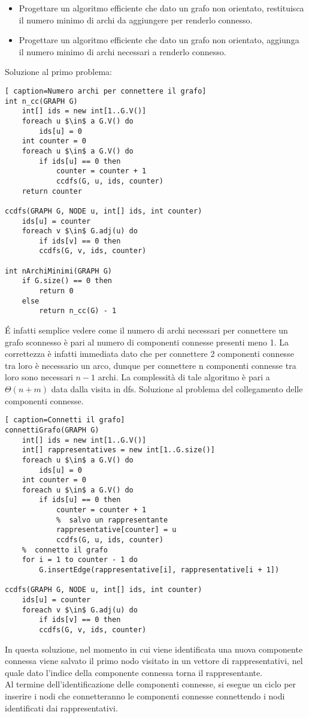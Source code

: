 \documentclass[../cheatSheetAlgoritmi.tex]{subfiles}
\begin{document}
\begin{itemize}
	\item Progettare un algoritmo efficiente che dato un grafo non orientato, restituisca il numero minimo di archi da aggiungere per renderlo connesso.
	\item Progettare un algoritmo efficiente che dato un grafo non orientato, aggiunga il numero minimo di archi necessari a renderlo connesso.
\end{itemize}

Soluzione al primo problema:
\newpage
\begin{lstlisting}[ caption=Numero archi per connettere il grafo]
int n_cc(GRAPH G)
	int[] ids = new int[1..G.V()]
  	foreach u $\in$ a G.V() do
    	ids[u] = 0
  	int counter = 0
  	foreach u $\in$ a G.V() do
    	if ids[u] == 0 then
      		counter = counter + 1
      		ccdfs(G, u, ids, counter)
  	return counter

ccdfs(GRAPH G, NODE u, int[] ids, int counter)
	ids[u] = counter
  	foreach v $\in$ G.adj(u) do
    	if ids[v] == 0 then
      	ccdfs(G, v, ids, counter)

int nArchiMinimi(GRAPH G)
	if G.size() == 0 then
    	return 0
  	else
    	return n_cc(G) - 1
\end{lstlisting}

É infatti semplice vedere come il numero di archi necessari per connettere un grafo sconnesso è pari al numero di componenti connesse presenti meno 1. La correttezza è infatti immediata dato che per connettere 2 componenti connesse tra loro è necessario un arco, dunque per connettere n componenti connesse tra loro sono necessari $n-1$ archi. La complessità di tale algoritmo è pari a $\Theta(n + m)$ data dalla visita in dfs. Soluzione al problema del collegamento delle componenti connesse.
\begin{lstlisting}[ caption=Connetti il grafo]
connettiGrafo(GRAPH G)
	int[] ids = new int[1..G.V()]
  	int[] rappresentatives = new int[1..G.size()]
  	foreach u $\in$ a G.V() do
    	ids[u] = 0
  	int counter = 0
  	foreach u $\in$ a G.V() do
    	if ids[u] == 0 then
      		counter = counter + 1
      		%  salvo un rappresentante
      		rappresentative[counter] = u
      		ccdfs(G, u, ids, counter)
  	%  connetto il grafo
  	for i = 1 to counter - 1 do
  		G.insertEdge(rappresentative[i], rappresentative[i + 1])
  
ccdfs(GRAPH G, NODE u, int[] ids, int counter)
	ids[u] = counter
  	foreach v $\in$ G.adj(u) do
    	if ids[v] == 0 then
      	ccdfs(G, v, ids, counter)
\end{lstlisting}
In questa soluzione, nel momento in cui viene identificata una nuova componente connessa viene salvato il primo nodo visitato in un vettore di rappresentativi, nel quale dato l'indice della componente connessa torna il rappresentante. \\
Al termine dell'identificazione delle componenti connesse, si esegue un ciclo per inserire i nodi che connetteranno le componenti connesse connettendo i nodi identificati dai rappresentativi.
\end{document}
